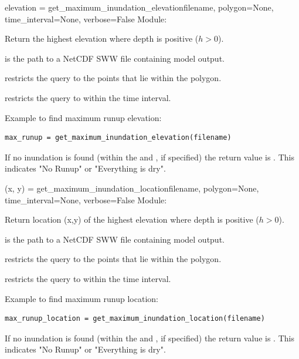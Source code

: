 \documentclass{manual}
\begin{document}
\begin{funcdesc}{elevation = get_maximum_inundation_elevation}{filename,
                                     polygon=None,
                                     time_interval=None,
                                     verbose=False}
Module: 

Return the highest elevation where depth is positive ($h > 0$).

 is the path to a NetCDF SWW file containing \anuga model output.

 restricts the query to the points that lie within the polygon.

 restricts the query to within the time interval.

Example to find maximum runup elevation:

\begin{verbatim}
max_runup = get_maximum_inundation_elevation(filename)
\end{verbatim}

If no inundation is found (within the  and , if specified)
the return value is . This indicates "No Runup" or "Everything is dry".
\end{funcdesc}

\begin{funcdesc}{(x, y) = get_maximum_inundation_location}{filename,
                                    polygon=None,
                                    time_interval=None,
                                    verbose=False}
Module: 

Return location (x,y) of the highest elevation where depth is positive ($h > 0$).

 is the path to a NetCDF SWW file containing \anuga model output.

 restricts the query to the points that lie within the polygon.

 restricts the query to within the time interval.

Example to find maximum runup location:

\begin{verbatim}
max_runup_location = get_maximum_inundation_location(filename)
\end{verbatim}

If no inundation is found (within the  and , if specified)
the return value is . This indicates "No Runup" or "Everything is dry".
\end{funcdesc}
\end{document}
